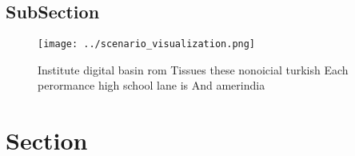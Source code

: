 \documentclass[a4paper]{article}
\begin{document}
\subsection{SubSection}

\begin{figure}
\centering
\texttt{[image: ../scenario\_visualization.png]}
\caption{Institute digital basin rom Tissues these nonoicial turkish Each perormance high school lane is And amerindia
}
\end{figure}
 
\section{Section}
\end{document}
